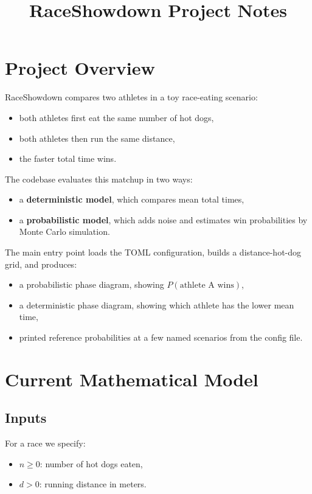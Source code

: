 \documentclass[11pt]{article}
\title{RaceShowdown Project Notes}
\author{}
\date{}
\begin{document}
\maketitle

\section*{Project Overview}

RaceShowdown compares two athletes in a toy race-eating scenario:
\begin{itemize}
    \item both athletes first eat the same number of hot dogs,
    \item both athletes then run the same distance,
    \item the faster total time wins.
\end{itemize}

The codebase evaluates this matchup in two ways:
\begin{itemize}
    \item a \textbf{deterministic model}, which compares mean total times,
    \item a \textbf{probabilistic model}, which adds noise and estimates win probabilities by Monte Carlo simulation.
\end{itemize}

The main entry point loads the TOML configuration, builds a distance-hot-dog grid, and produces:
\begin{itemize}
    \item a probabilistic phase diagram, showing $P(\text{athlete A wins})$,
    \item a deterministic phase diagram, showing which athlete has the lower mean time,
    \item printed reference probabilities at a few named scenarios from the config file.
\end{itemize}

\section*{Current Mathematical Model}

\subsection*{Inputs}

For a race we specify:
\begin{itemize}
    \item $n \geq 0$: number of hot dogs eaten,
    \item $d > 0$: running distance in meters.
\end{itemize}
\end{document}
